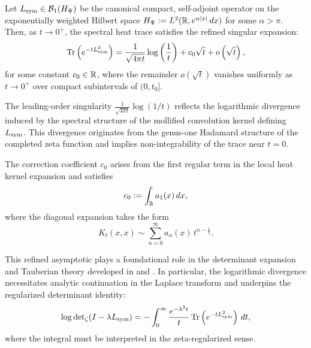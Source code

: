 \begin{proposition}
\label{prop:short_time_heat_expansion}
Let \( L_{\mathrm{sym}} \in \mathcal{B}_1(H_{\Psi}) \) be the canonical compact, self-adjoint operator on the exponentially weighted Hilbert space \( H_{\Psi} := L^2(\mathbb{R}, e^{\alpha |x|} \, dx) \) for some \( \alpha > \pi \). Then, as \( t \to 0^+ \), the spectral heat trace satisfies the refined singular expansion:
\[
\operatorname{Tr}\left(e^{-t L_{\mathrm{sym}}^2}\right)
= \frac{1}{\sqrt{4\pi t}} \log\left( \frac{1}{t} \right)
+ c_0 \sqrt{t} + o\left( \sqrt{t} \right),
\]
for some constant \( c_0 \in \mathbb{R} \), where the remainder \( o(\sqrt{t}) \) vanishes uniformly as \( t \to 0^+ \) over compact subintervals of \( (0, t_0] \).

\medskip
\noindent
The leading-order singularity \( \frac{1}{\sqrt{4\pi t}} \log(1/t) \) reflects the logarithmic divergence induced by the spectral structure of the mollified convolution kernel defining \( L_{\mathrm{sym}} \). This divergence originates from the genus-one Hadamard structure of the completed zeta function and implies non-integrability of the trace near \( t = 0 \).

\medskip
\noindent
The correction coefficient \( c_0 \) arises from the first regular term in the local heat kernel expansion and satisfies
\[
c_0 := \int_{\mathbb{R}} a_1(x) \, dx,
\]
where the diagonal expansion takes the form
\[
K_t(x,x) \sim \sum_{n=0}^{\infty} a_n(x)\, t^{n - \frac{1}{2}}.
\]

\medskip
\noindent
This refined asymptotic plays a foundational role in the determinant expansion and Tauberian theory developed in  and . In particular, the logarithmic divergence necessitates analytic continuation in the Laplace transform and underpins the regularized determinant identity:
\[
\log \det\nolimits_{\zeta}(I - \lambda L_{\mathrm{sym}}) = - \int_0^\infty \frac{e^{-\lambda^2 t}}{t} \operatorname{Tr}\left(e^{-t L_{\mathrm{sym}}^2} \right) \, dt,
\]
where the integral must be interpreted in the zeta-regularized sense.
\end{proposition}
